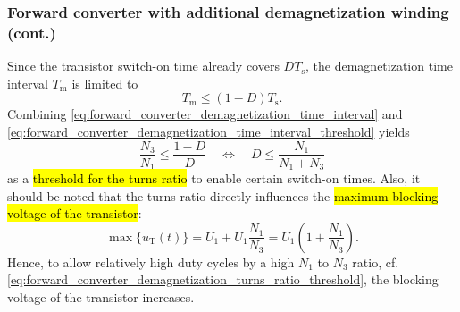 \begin{frame}
	\frametitle{Forward converter with additional demagnetization winding (cont.)}
	Since the transistor switch-on time already covers $D T_\mathrm{s}$, the demagnetization time interval $T_\mathrm{m}$ is limited to
	\begin{equation}
		T_\mathrm{m} \leq (1-D)T_\mathrm{s}.
		\label{eq:forward_converter_demagnetization_time_interval_threshold}
	\end{equation}\pause
	Combining \eqref{eq:forward_converter_demagnetization_time_interval} and \eqref{eq:forward_converter_demagnetization_time_interval_threshold} yields
	\begin{equation}
		\frac{N_3}{N_1} \leq \frac{1-D}{D} \quad \Leftrightarrow \quad D \leq \frac{N_1}{N_1+N_3}
		\label{eq:forward_converter_demagnetization_turns_ratio_threshold}
	\end{equation}
	as a \hl{threshold for the turns ratio} to enable certain switch-on times. \pause Also, it should be noted that the turns ratio directly influences the \hl{maximum blocking voltage of the transistor}:
	\begin{equation}
		\max\{u_\mathrm{T}(t)\} = U_1 + U_1 \frac{N_1}{N_3} = U_1 \left(1 + \frac{N_1}{N_3}\right).
	\end{equation}\pause
	Hence, to allow relatively high duty cycles by a high $N_1$ to $N_3$ ratio, cf. \eqref{eq:forward_converter_demagnetization_turns_ratio_threshold}, the blocking voltage of the transistor increases.
\end{frame}

